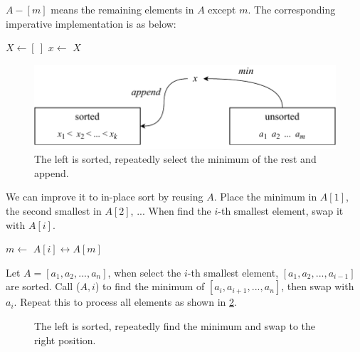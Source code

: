 \documentclass[b5paper]{article}
\begin{document}
$A - [m]$ means the remaining elements in $A$ except $m$. The corresponding imperative implementation is as below:

\begin{algorithmic}[1]
  \State $X \gets [\ ]$
    \State $x \gets$ 
    \State {}
    \State {}
  \EndWhile
  \State \Return $X$
\EndFunction
\end{algorithmic}

\begin{figure}[htbp]
  \centering
  \includegraphics[scale=0.8]{img/ssort}
  \caption{The left is sorted, repeatedly select the minimum of the rest and append.}
  \label{fig:sel-sort}
\end{figure}

We can improve it to in-place sort by reusing $A$. Place the minimum in $A[1]$, the second smallest in $A[2]$, ... When find the $i$-th smallest element, swap it with $A[i]$.

\begin{algorithmic}[1]
    \State $m \gets$ 
    \State {} $A[i] \leftrightarrow A[m]$
  \EndFor
\EndFunction
\end{algorithmic}

Let $A = [a_1, a_2, ..., a_n]$, when select the $i$-th smallest element, $[a_1, a_2, ..., a_{i-1}]$ are sorted. Call ($A, i$) to find the minimum of $[a_i, a_{i+1}, ..., a_n]$, then swap with $a_i$. Repeat this to process all elements as shown in \cref{fig:in-place-ssort}.

\begin{figure}[htbp]
  \centering
  \caption{The left is sorted, repeatedly find the minimum and swap to the right position.}
  \label{fig:in-place-ssort}
\end{figure}
\end{document}
